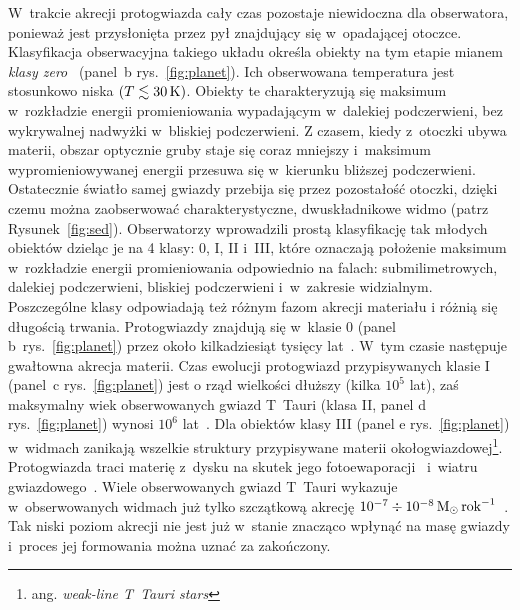 W~trakcie akrecji protogwiazda cały czas pozostaje niewidoczna dla obserwatora,
ponieważ jest przysłonięta przez pył znajdujący się w~opadającej otoczce.
Klasyfikacja obserwacyjna takiego układu określa obiekty na tym etapie mianem
\emph{klasy zero}~\cite{andre} (panel~b rys.~\ref{fig:planet}). Ich obserwowana temperatura jest
stosunkowo niska $(T \lesssim 30\hbox{$\thinspace\textrm{K}$})$. Obiekty te charakteryzują się maksimum
w~rozkładzie energii promieniowania wypadającym w~dalekiej podczerwieni, bez
wykrywalnej nadwyżki w~bliskiej podczerwieni. Z czasem, kiedy z~otoczki ubywa
materii, obszar optycznie gruby staje się coraz mniejszy i~maksimum
wypromieniowywanej energii przesuwa się w~kierunku bliższej podczerwieni.
Ostatecznie światło samej gwiazdy przebija się przez pozostałość otoczki, dzięki
czemu można zaobserwować charakterystyczne, dwuskładnikowe widmo (patrz
Rysunek~\ref{fig:sed}). Obserwatorzy wprowadzili prostą klasyfikację tak młodych
obiektów dzieląc je na 4 klasy: 0, I, II i~III, które oznaczają położenie
maksimum w~rozkładzie energii promieniowania odpowiednio na falach:
submilimetrowych, dalekiej podczerwieni, bliskiej podczerwieni i~w~zakresie
widzialnym. Poszczególne klasy odpowiadają też różnym fazom akrecji materiału i
różnią się długością trwania. Protogwiazdy znajdują się w~klasie 0 (panel
b~rys.~\ref{fig:planet}) przez około
kilkadziesiąt tysięcy lat~\cite{FSSK06}. W~tym czasie następuje gwałtowna
akrecja materii.  Czas ewolucji protogwiazd przypisywanych klasie I (panel~c
rys.~\ref{fig:planet}) jest o rząd wielkości dłuższy (kilka $10^5$ lat), zaś
maksymalny wiek obserwowanych gwiazd T~Ta\-u\-ri (klasa II, panel d
rys.~\ref{fig:planet}) wynosi $10^6$ lat~\cite{HCGD98}.  Dla obiektów klasy III
(panel e rys.~\ref{fig:planet}) w~widmach zanikają wszelkie struktury
przypisywane materii okołogwiazdowej\footnote{ang. \emph{weak-line T~Tauri
stars}}. Pro\-to\-gwia\-zda traci materię z~dysku na skutek jego
fotoewaporacji~\cite{ACP06} i~wiatru gwiazdowego~\cite{PN86}. Wiele
obserwowanych gwiazd T~Tauri wykazuje w~obserwowanych widmach już tylko
szczątkową akrecję $10^{-7} \div 10^{-8} \hbox{$\mathrm{\thinspace M_{\odot}}$}\hbox{$\thinspace\textrm{rok}$}^{-1}$~\cite{Hart98}. Tak
niski poziom akrecji nie jest już w~stanie znacząco wpłynąć na masę gwiazdy
i~proces jej formowania można uznać za zakończony.

